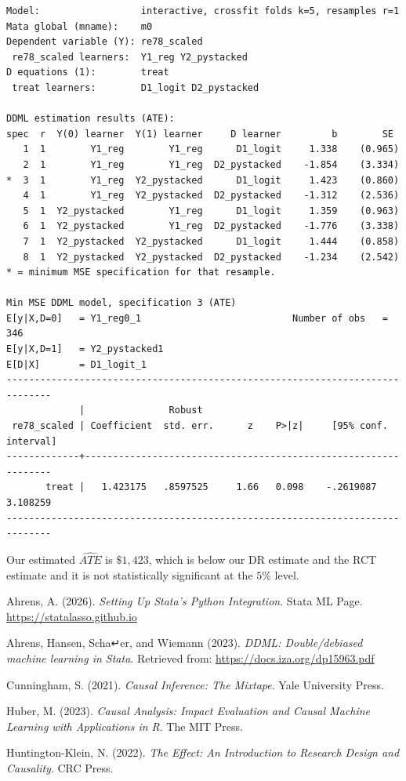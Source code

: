 \documentclass[
]{book}
\begin{document}
\begin{verbatim}
Model:                  interactive, crossfit folds k=5, resamples r=1
Mata global (mname):    m0
Dependent variable (Y): re78_scaled
 re78_scaled learners:  Y1_reg Y2_pystacked
D equations (1):        treat
 treat learners:        D1_logit D2_pystacked

DDML estimation results (ATE):
spec  r  Y(0) learner  Y(1) learner     D learner         b        SE 
   1  1        Y1_reg        Y1_reg      D1_logit     1.338    (0.965)
   2  1        Y1_reg        Y1_reg  D2_pystacked    -1.854    (3.334)
*  3  1        Y1_reg  Y2_pystacked      D1_logit     1.423    (0.860)
   4  1        Y1_reg  Y2_pystacked  D2_pystacked    -1.312    (2.536)
   5  1  Y2_pystacked        Y1_reg      D1_logit     1.359    (0.963)
   6  1  Y2_pystacked        Y1_reg  D2_pystacked    -1.776    (3.338)
   7  1  Y2_pystacked  Y2_pystacked      D1_logit     1.444    (0.858)
   8  1  Y2_pystacked  Y2_pystacked  D2_pystacked    -1.234    (2.542)
* = minimum MSE specification for that resample.

Min MSE DDML model, specification 3 (ATE)
E[y|X,D=0]   = Y1_reg0_1                           Number of obs   =       346
E[y|X,D=1]   = Y2_pystacked1
E[D|X]       = D1_logit_1
------------------------------------------------------------------------------
             |               Robust
 re78_scaled | Coefficient  std. err.      z    P>|z|     [95% conf. interval]
-------------+----------------------------------------------------------------
       treat |   1.423175   .8597525     1.66   0.098    -.2619087    3.108259
------------------------------------------------------------------------------
\end{verbatim}

Our estimated \(\hat{ATE}\) is \(\$1,423\), which is below our DR estimate and the RCT estimate and it is not statistically significant at the \(5\%\) level.

Ahrens, A. (2026). \emph{Setting Up Stata's Python Integration}. Stata ML Page. \url{https://statalasso.github.io}

Ahrens, Hansen, Scha↵er, and Wiemann (2023). \emph{DDML: Double/debiased machine learning in Stata}. Retrieved from: \url{https://docs.iza.org/dp15963.pdf}

Cunningham, S. (2021). \emph{Causal Inference: The Mixtape}. Yale University Press.

Huber, M. (2023). \emph{Causal Analysis: Impact Evaluation and Causal Machine Learning with Applications in R}. The MIT Press.

Huntington-Klein, N. (2022). \emph{The Effect: An Introduction to Research Design and Causality}. CRC Press.


\end{document}
